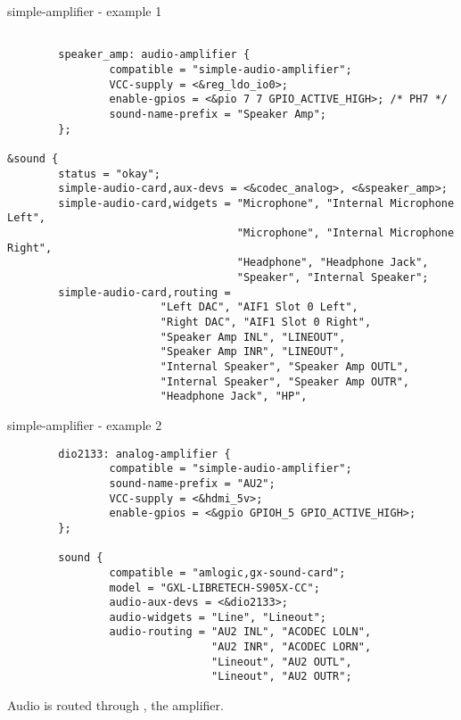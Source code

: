 \begin{frame}[fragile]{simple-amplifier - example 1}
  \begin{block}{}
    \fontsize{7}{6}\selectfont
    \begin{verbatim}

        speaker_amp: audio-amplifier {
                compatible = "simple-audio-amplifier";
                VCC-supply = <&reg_ldo_io0>;
                enable-gpios = <&pio 7 7 GPIO_ACTIVE_HIGH>; /* PH7 */
                sound-name-prefix = "Speaker Amp";
        };

&sound {
        status = "okay";
        simple-audio-card,aux-devs = <&codec_analog>, <&speaker_amp>;
        simple-audio-card,widgets = "Microphone", "Internal Microphone Left",
                                    "Microphone", "Internal Microphone Right",
                                    "Headphone", "Headphone Jack",
                                    "Speaker", "Internal Speaker";
        simple-audio-card,routing =
                        "Left DAC", "AIF1 Slot 0 Left",
                        "Right DAC", "AIF1 Slot 0 Right",
                        "Speaker Amp INL", "LINEOUT",
                        "Speaker Amp INR", "LINEOUT",
                        "Internal Speaker", "Speaker Amp OUTL",
                        "Internal Speaker", "Speaker Amp OUTR",
                        "Headphone Jack", "HP",
    \end{verbatim}
  \end{block}
\end{frame}

\begin{frame}[fragile]{simple-amplifier - example 2}
  \begin{block}{}
    \fontsize{7}{6}\selectfont
    \begin{verbatim}
        dio2133: analog-amplifier {
                compatible = "simple-audio-amplifier";
                sound-name-prefix = "AU2";
                VCC-supply = <&hdmi_5v>;
                enable-gpios = <&gpio GPIOH_5 GPIO_ACTIVE_HIGH>;
        };

        sound {
                compatible = "amlogic,gx-sound-card";
                model = "GXL-LIBRETECH-S905X-CC";
                audio-aux-devs = <&dio2133>;
                audio-widgets = "Line", "Lineout";
                audio-routing = "AU2 INL", "ACODEC LOLN",
                                "AU2 INR", "ACODEC LORN",
                                "Lineout", "AU2 OUTL",
                                "Lineout", "AU2 OUTR";
    \end{verbatim}
  \end{block}
  Audio is routed through , the amplifier.
\end{frame}

